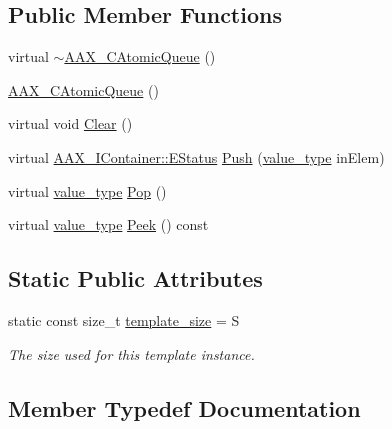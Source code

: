 \subsection*{Public Member Functions}
\begin{DoxyCompactItemize}
\item 
virtual \hyperlink{a00010_a838ca2b3763f10c4e4d9e72b676fd358}{$\sim$\+A\+A\+X\+\_\+\+C\+Atomic\+Queue} ()
\item 
\hyperlink{a00010_ae048321b8d75f9fa073e6a24088d8260}{A\+A\+X\+\_\+\+C\+Atomic\+Queue} ()
\item 
virtual void \hyperlink{a00010_a9819ff531e285f2acd2c9fd2351617c4}{Clear} ()
\item 
virtual \hyperlink{a00089_aea020100f0b06636ce7cb25c2fdb0af7}{A\+A\+X\+\_\+\+I\+Container\+::\+E\+Status} \hyperlink{a00010_a2304d6ba1f1026b6a42de48056ab3050}{Push} (\hyperlink{a00010_acbb95bad3be34c7e4c770bc8c455c252}{value\+\_\+type} in\+Elem)
\item 
virtual \hyperlink{a00010_acbb95bad3be34c7e4c770bc8c455c252}{value\+\_\+type} \hyperlink{a00010_a0c64180813c16b4952761f82e32d7edd}{Pop} ()
\item 
virtual \hyperlink{a00010_acbb95bad3be34c7e4c770bc8c455c252}{value\+\_\+type} \hyperlink{a00010_a0b82e81edc0d63a81c1b41acaf2a493d}{Peek} () const 
\end{DoxyCompactItemize}
\subsection*{Static Public Attributes}
\begin{DoxyCompactItemize}
\item 
static const size\+\_\+t \hyperlink{a00010_a7040410a6baeae48d153ef44ee0df1f1}{template\+\_\+size} = S
\begin{DoxyCompactList}\small\item\em The size used for this template instance. \end{DoxyCompactList}\end{DoxyCompactItemize}


\subsection{Member Typedef Documentation}
\hypertarget{a00010_aae36349d9419de62ce8e74b397749c27}{}
